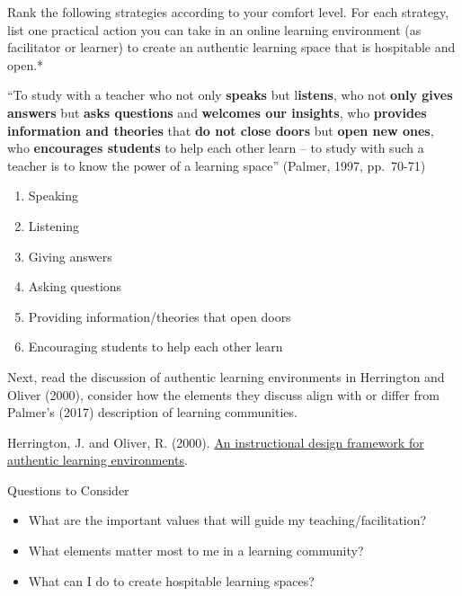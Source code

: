 \documentclass[
]{book}
\providecommand{\tightlist}{%
  \setlength{\itemsep}{0pt}\setlength{\parskip}{0pt}}
\begin{document}
\begin{reflect}
Rank the following strategies according to your comfort level. For each
strategy, list one practical action you can take in an online learning
environment (as facilitator or learner) to create an authentic learning
space that is hospitable and open.*

``To study with a teacher who not only \textbf{speaks} but
l\textbf{istens}, who not \textbf{only gives answers} but \textbf{asks
questions} and \textbf{welcomes our insights}, who \textbf{provides
information and theories} that \textbf{do not close doors} but
\textbf{open new ones}, who \textbf{encourages students} to help each
other learn -- to study with such a teacher is to know the power of a
learning space'' (Palmer, 1997, pp.~70-71)

\begin{enumerate}
\def\labelenumi{\arabic{enumi}.}
\tightlist
\item
  Speaking\\
\item
  Listening\\
\item
  Giving answers\\
\item
  Asking questions\\
\item
  Providing information/theories that open doors\\
\item
  Encouraging students to help each other learn
\end{enumerate}

Next, read the discussion of authentic learning environments in
Herrington and Oliver (2000), consider how the elements they discuss
align with or differ from Palmer's (2017) description of learning
communities.

Herrington, J. and Oliver, R. (2000).
\href{https://ro.uow.edu.au/edupapers/31/}{An instructional design
framework for authentic learning environments}.

{Questions to Consider}

\begin{itemize}
\tightlist
\item
  What are the important values that will guide my
  teaching/facilitation?\\
\item
  What elements matter most to me in a learning community?\\
\item
  What can I do to create hospitable learning spaces?
\end{itemize}
\end{reflect}
\end{document}
